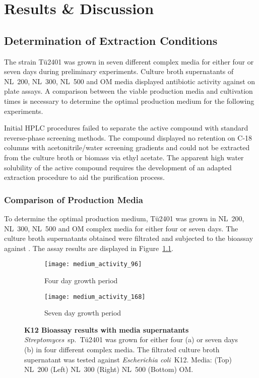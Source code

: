 
\chapter{Results \& Discussion}

\section{Determination of Extraction Conditions} %
\label{sec:determination_of_extraction_conditions}

The strain Tü2401 was grown in seven different complex media for either four or seven days during preliminary experiments.
Culture broth supernatants of NL~200, NL~300, NL~500 and OM media displayed antibiotic activity against \coli  on plate assays.
A comparison between the viable production media and cultivation times is necessary to determine the optimal production medium for the following experiments.

Initial HPLC procedures failed to separate the active compound with standard reverse-phase screening methods.
The compound displayed no retention on C-18 columns with acetonitrile/water screening gradients and could not be extracted from the culture broth or biomass via ethyl acetate.
The apparent high water solubility of the active compound requires the development of an adapted extraction procedure to aid the purification process.

\subsection{Comparison of Production Media} %
\label{sub:comparison_of_production_media}

To determine the optimal production medium, Tü2401 was grown in NL~200, NL~300, NL~500 and OM complex media for either four or seven days.
The culture broth supernatants obtained were filtrated and subjected to the bioassay against \coli{}.
The assay results are displayed in Figure~\ref{fig:medium_activity}.

\begin{figure}[htbp]
	\centering
	\begin{subfigure}{0.4\textwidth}
		\texttt{[image: medium\_activity\_96]}
		\caption{Four day growth period}
	\end{subfigure}%
	\begin{subfigure}{0.4\textwidth}
		\texttt{[image: medium\_activity\_168]}
		\caption{Seven day growth period}
	\end{subfigure}
	\caption[K12 Bioassay results with media supernatants]{%
		\textbf{K12 Bioassay results with media supernatants} \textit{Streptomyces}~sp.~Tü2401 was grown for either four (a)
    or seven days (b) in four different complex media. The filtrated culture broth supernatant was tested against
    \textit{Escherichia coli}~K12. Media: (Top) NL~200 (Left) NL~300 (Right) NL~500 (Bottom) OM.}
	\label{fig:medium_activity}
\end{figure}

